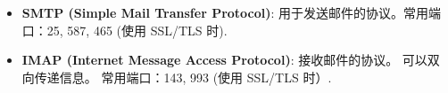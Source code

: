 

\begin{issues}
\issueDraft
\end{issues}

\begin{itemize}
\item \textbf{SMTP (Simple Mail Transfer Protocol)}: 用于发送邮件的协议。常用端口：25, 587, 465 (使用 SSL/TLS 时).
\item \textbf{IMAP (Internet Message Access Protocol)}: 接收邮件的协议。 可以双向传递信息。 常用端口：143, 993 (使用 SSL/TLS 时）.
\end{itemize}
